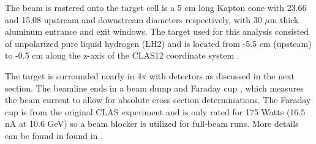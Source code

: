              

            The beam is rastered onto the target cell  is a 5 cm long Kapton cone with 23.66 and 15.08 upstream and downstream diameters respectively, with 30 $\mu$m thick aluminum entrance and exit windows. The target used for this analysis consisted of unpolarized pure liquid hydrogen (LH2) and is located from -5.5 cm (upsteam) to -0.5 cm along the z-axis of the CLAS12 coordinate system \parencite{Baltzell2020ThePerformance}. 
            

            The target is surrounded nearly in 4$\pi$ with detectors as discussed in the next section. The beamline ends in a beam dump and Faraday cup , which measures the beam current to allow for absolute cross section determinations. The Faraday cup is from the original CLAS experiment and is only rated for 175 Watts (16.5 nA at 10.6 GeV) so a beam blocker is utilized for full-beam runs. More details can be found in found in \parencite{Mecking2003TheCLAS}. %
            
  
    
